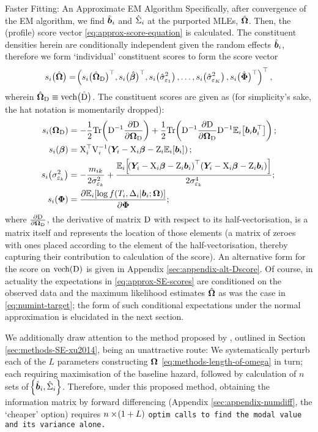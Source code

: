 \begin{chapter}{\label{cha:approx}Faster Fitting: An Approximate EM Algorithm}
  Specifically, after convergence of the EM algorithm, we find $\hat{\bm{b}}_i$ and $\hat{\Sigma}_i$ at the purported MLEs, $\hat{\bm{\Omega}}$. Then, the (profile) score vector \eqref{eq:approx-score-equation} is calculated. The constituent densities herein are conditionally independent given the random effects $\hat{\bm{b}}_i$, therefore we form `individual' constituent scores to form the score vector 
  \begin{equation*}
      s_i\big(\hat{\bm{\Omega}}\big)=\!\left( s_i\big(\hat{\bm{\Omega}}_{\mathrm{D}}\big)^\top, s_i\big(\hat{\bm{\beta}}\big)^\top, s_i\!\left(\hat{\sigma}^2_{\varepsilon_1}\right), \dots, s_i\!\left(\hat{\sigma}^2_{\varepsilon_K}\right), s_i\big(\hat{\bm{\Phi}}\big)^\top\right)^\top,
  \end{equation*}
  wherein $\hat{\bm{\Omega}}_{\mathrm{D}}\equiv\text{vech}\big(\hat{\mathrm{D}}\big)$. The constituent scores are given as (for simplicity's sake, the hat notation is momentarily dropped):
  \begin{equation}
      \begin{aligned}
          s_i\lb\bO_\D\rb&=-\frac{1}{2}\mathrm{Tr}\lb\D^{-1}\dXdY{\D}{\bO_\D}\rb+\frac{1}{2}\mathrm{Tr}\lb\D^{-1}\dXdY{\D}{\bO_\D}\D^{-1}\Expi{\tcrossprod{\b}}\rb;\\
          s_i\lb\bb\rb&=\X_i^\top\mathrm{V}_i^{-1}\lb\Y-\X_i\bb-\Z_i\Expi{\b}\rb;\\
          s_i\lb\sek\rb&=-\frac{m_{ik}}{2\sek}+\frac{\Expi{\lb\Y-\X_i\bb-\Z_i\b\rb^\top\lb\Y-\X_i\bb-\Z_i\b\rb}}{2\sigma^4_{\varepsilon_k}};\\
          s_i\lb\bm{\Phi}\rb&=\dXdY{\Expi{\log f\lb T_i, \Delta_i|\b;\bO\rb}}{\bm{\Phi}};
      \end{aligned}
  \label{eq:approx-SE-scores}
  \end{equation}
  where $\frac{\partial\mathrm{D}}{\partial\bm{\mathrm{\Omega}}_{\mathrm{D}}}$, the derivative of matrix $\mathrm{D}$ with respect to its half-vectorisation, is a matrix itself and represents the location of those elements (\ie a matrix of zeroes with ones placed according to the element of the half-vectorisation, thereby capturing their contribution to calculation of the score). An alternative form for the score on $\text{vech}\!\left({\mathrm{D}}\right)$ is given in Appendix \ref{sec:appendix-alt-Dscore}. Of course, in actuality the expectations in \eqref{eq:approx-SE-scores} are conditioned on the observed data and the maximum likelihood estimates $\hat{\bm{\Omega}}$ as was the case in \eg \eqref{eq:numint-target}; the form of such conditional expectations under the normal approximation is elucidated in the next section.

  We additionally draw attention to the method proposed by \citet{Xu2014}, outlined in Section \ref{sec:methods-SE-xu2014}, being an unattractive route: We systematically perturb each of the $L$ parameters constructing $\bm{\mathrm{\Omega}}$ \eqref{eq:methods-length-of-omega} in turn; each requiring maximisation of the baseline hazard, followed by calculation of $n$ sets of $\!\left\{\hat{\bm{b}}_i,\hat{\Sigma}_i\right\}$. Therefore, under this proposed method, obtaining the information matrix by forward differencing (Appendix \ref{sec:appendix-numdiff}, the `cheaper' option) requires $n\times \!\left(1+L\right)$ \tt{optim} calls to find the modal value and its variance alone.
  

\end{chapter}
